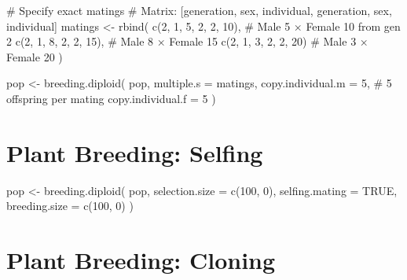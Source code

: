 \documentclass[
  letterpaper,
]{book}
\newenvironment{Shaded}{\begin{snugshade}}{\end{snugshade}}
\newcommand{\AttributeTok}[1]{\textcolor[rgb]{0.40,0.45,0.13}{#1}}
\newcommand{\CommentTok}[1]{\textcolor[rgb]{0.37,0.37,0.37}{#1}}
\newcommand{\ConstantTok}[1]{\textcolor[rgb]{0.56,0.35,0.01}{#1}}
\newcommand{\DecValTok}[1]{\textcolor[rgb]{0.68,0.00,0.00}{#1}}
\newcommand{\FunctionTok}[1]{\textcolor[rgb]{0.28,0.35,0.67}{#1}}
\newcommand{\NormalTok}[1]{\textcolor[rgb]{0.00,0.23,0.31}{#1}}
\newcommand{\OtherTok}[1]{\textcolor[rgb]{0.00,0.23,0.31}{#1}}
\begin{document}
\begin{Shaded}
\begin{Highlighting}[]
\CommentTok{\# Specify exact matings}
\CommentTok{\# Matrix: [generation, sex, individual, generation, sex, individual]}
\NormalTok{matings }\OtherTok{\textless{}{-}} \FunctionTok{rbind}\NormalTok{(}
  \FunctionTok{c}\NormalTok{(}\DecValTok{2}\NormalTok{, }\DecValTok{1}\NormalTok{, }\DecValTok{5}\NormalTok{,  }\DecValTok{2}\NormalTok{, }\DecValTok{2}\NormalTok{, }\DecValTok{10}\NormalTok{),  }\CommentTok{\# Male 5 × Female 10 from gen 2}
  \FunctionTok{c}\NormalTok{(}\DecValTok{2}\NormalTok{, }\DecValTok{1}\NormalTok{, }\DecValTok{8}\NormalTok{,  }\DecValTok{2}\NormalTok{, }\DecValTok{2}\NormalTok{, }\DecValTok{15}\NormalTok{),  }\CommentTok{\# Male 8 × Female 15}
  \FunctionTok{c}\NormalTok{(}\DecValTok{2}\NormalTok{, }\DecValTok{1}\NormalTok{, }\DecValTok{3}\NormalTok{,  }\DecValTok{2}\NormalTok{, }\DecValTok{2}\NormalTok{, }\DecValTok{20}\NormalTok{)   }\CommentTok{\# Male 3 × Female 20}
\NormalTok{)}

\NormalTok{pop }\OtherTok{\textless{}{-}} \FunctionTok{breeding.diploid}\NormalTok{(}
\NormalTok{  pop,}
  \AttributeTok{multiple.s =}\NormalTok{ matings,}
  \AttributeTok{copy.individual.m =} \DecValTok{5}\NormalTok{,           }\CommentTok{\# 5 offspring per mating}
  \AttributeTok{copy.individual.f =} \DecValTok{5}
\NormalTok{)}
\end{Highlighting}
\end{Shaded}

\section{Plant Breeding: Selfing}\label{plant-breeding-selfing}

\begin{Shaded}
\begin{Highlighting}[]
\NormalTok{pop }\OtherTok{\textless{}{-}} \FunctionTok{breeding.diploid}\NormalTok{(}
\NormalTok{  pop,}
  \AttributeTok{selection.size =} \FunctionTok{c}\NormalTok{(}\DecValTok{100}\NormalTok{, }\DecValTok{0}\NormalTok{),}
  \AttributeTok{selfing.mating =} \ConstantTok{TRUE}\NormalTok{,}
  \AttributeTok{breeding.size =} \FunctionTok{c}\NormalTok{(}\DecValTok{100}\NormalTok{, }\DecValTok{0}\NormalTok{)}
\NormalTok{)}
\end{Highlighting}
\end{Shaded}

\section{Plant Breeding: Cloning}\label{plant-breeding-cloning}
\end{document}
